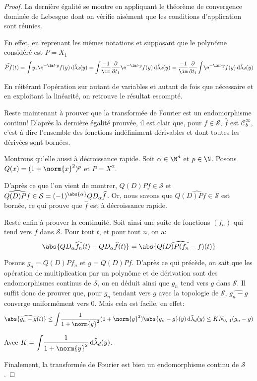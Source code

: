\begin{proof}
\medskip
La dernière égalité se montre en appliquant le théorème de convergence dominée de Lebesgue dont on vérifie aisément que les conditions d'application sont réunies.

\medskip
En effet, en reprenant les mêmes notations et supposant que le polynôme considéré est $P = X_1$
\[
\widehat{Pf}(t) = \displaystyle{\int}  y_1 \e^{-\im t \cdot y} f(y) \, \mathrm d \tilde{\lambda}_d(y)  = \displaystyle{\int} \frac{-1}{\im} \frac{\partial}{\partial t_1} \e^{-\im t \cdot y} f(y) \, \mathrm d \tilde{\lambda}_d(y) = \frac{-1}{\im} \frac{\partial}{\partial t_1} \displaystyle{\int} \e^{-\im t \cdot y} f(y) \, \mathrm d \tilde{\lambda}_d(y)
\]

En réitérant l'opération sur autant de variables et autant de fois que nécessaire et en exploitant la linéarité, on retrouve le résultat escompté.

\medskip
Reste maintenant à prouver que la transformée de Fourier est un endomorphisme continu! D'après la dernière égalité prouvée, il est clair que, pour $f \in \mathcal{S}$, $\widehat{f}$ est $\mathcal{C}^{\infty}_b$, c'est à dire l'ensemble des fonctions indéfiniment dérivables et dont toutes les dérivées sont bornées. 


Montrons qu'elle aussi à décroissance rapide. Soit $\alpha \in \N^d$ et $p \in \N$. Posons $Q(x) = (1+\norm{x}^2)^p$ et $P=X^{\alpha}$. 

D'après ce que l'on vient de montrer, $Q(D) P f \in \mathcal{S}$ et $\widehat{Q(D) P f} \in \mathcal{S} = (-1)^{\abs{\alpha}} Q D_{\alpha}\widehat{f}$. Or, nous savons que $\widehat{Q(D) P f \in \mathcal{S}}$ est bornée, ce qui prouve que $\widehat{f}$ est à décroissance rapide.

\medskip
Reste enfin à prouver la continuité. Soit ainsi une suite de fonctions $(f_n)$ qui tend vers $f$ dans $\mathcal{S}$. Pour tout $t$, et pour tout $n$, on a:
\[
\abs{Q D_{\alpha}\widehat{f_n}(t) - Q D_{\alpha}\widehat{f}(t)} = \abs{\widehat{Q(D) P (f_n-f) } (t)}
\]

Posons  $g_n = Q(D) P f_n$ et $g = Q(D) P f$. D'après ce qui précède, on sait que les opération de multiplication par un polynôme et de dérivation sont des endomorphismes continus de $\mathcal{S}$, on en déduit ainsi que $g_n$ tend vers $g$ dans $\mathcal{S}$. Il suffit donc de prouver que, pour $g_n$ tendant vers $g$ avec la topologie de $\mathcal{S}$, $\widehat{g_n-g}$ converge uniformément vers $0$. Mais cela est facile, en effet:
\[
\abs{\widehat{g_n-g}(t)} \leq \displaystyle{\int} \frac{1}{1+\norm{y}^2} (1+\norm{y}^2) \abs{g_n-g}(y) \, \mathrm d \tilde{\lambda}_d(y) \leq K N_{0,~1}(g_n-g)
\]

Avec $K = \displaystyle{\int} \frac{1}{1+\norm{y}^2} \, \mathrm d \tilde{\lambda}_d(y)$. 

\medskip
Finalement, la transformée de Fourier est bien un endomorphisme continu de $\mathcal{S}$.
\end{proof}

